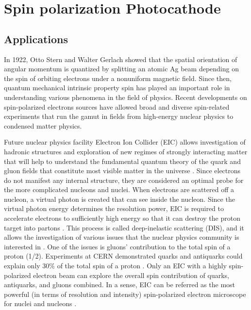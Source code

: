
\section{Spin polarization Photocathode}

\subsection{Applications}
In 1922, Otto Stern and Walter Gerlach showed that the spatial orientation of angular momentum is quantized by splitting an atomic Ag beam depending on the spin of orbiting electrons under a nonuniform magnetic field. Since then, quantum mechanical intrinsic property spin has played an important role in understanding various phenomena in the field of physics. Recent developments on spin-polarized electrons sources have allowed broad and diverse spin-related experiments that run the gamut in fields from high-energy nuclear physics to condensed matter physics.
	
Future nuclear physics facility Electron Ion Collider (EIC) allows investigation of hadronic structures and exploration of new regimes of strongly interacting matter that will help to understand the fundamental quantum theory of the quark and gluon fields that constitute most visible matter in the universe \cite{aschenauer2019electron,accardi2016electron}. Since electrons do not manifest any internal structure, they are considered an optimal probe for the more complicated nucleons and nuclei. When electrons are scattered off a nucleon, a virtual photon is created that can see inside the nucleon. Since the virtual photon energy determines the resolution power, EIC is required to accelerate electrons to sufficiently high energy so that it can destroy the proton target into partons \cite{NASreport}. This process is called deep-inelastic scattering (DIS), and it allows the investigation of various issues that the nuclear physics community is interested in \cite{aschenauer2019electron}. One of the issues is gluons' contribution to the total spin of a proton (1/2). Experiments at CERN demonstrated quarks and antiquarks could explain only 30\% of the total spin of a proton \cite{lrpns}. Only an EIC with a highly spin-polarized electron beam can explore the overall spin contribution of quarks, antiquarks, and gluons combined. In a sense, EIC can be referred as the most powerful (in terms of resolution and intensity) spin-polarized electron microscope for nuclei and nucleons \cite{NASreport}.

